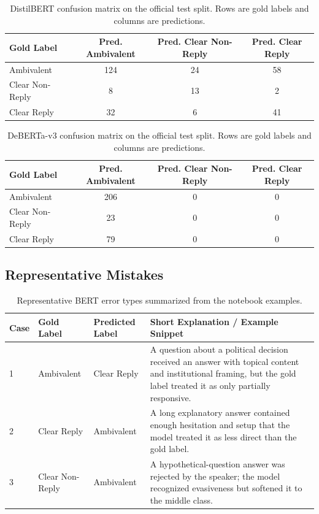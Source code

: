 \begin{table}[h]
\centering
\small
\begin{tabular}{lccc}
\toprule
Gold Label & Pred. Ambivalent & Pred. Clear Non-Reply & Pred. Clear Reply \\
\midrule
Ambivalent & 124 & 24 & 58 \\
Clear Non-Reply & 8 & 13 & 2 \\
Clear Reply & 32 & 6 & 41 \\
\bottomrule
\end{tabular}
\caption{DistilBERT confusion matrix on the official test split. Rows are gold labels and columns are predictions.}
\label{tab:distilbert-confusion}
\end{table}

\begin{table}[h]
\centering
\small
\begin{tabular}{lccc}
\toprule
Gold Label & Pred. Ambivalent & Pred. Clear Non-Reply & Pred. Clear Reply \\
\midrule
Ambivalent & 206 & 0 & 0 \\
Clear Non-Reply & 23 & 0 & 0 \\
Clear Reply & 79 & 0 & 0 \\
\bottomrule
\end{tabular}
\caption{DeBERTa-v3 confusion matrix on the official test split. Rows are gold labels and columns are predictions.}
\label{tab:deberta-confusion}
\end{table}

\subsection{Representative Mistakes}

\begin{table}[h]
\centering
\small
\begin{tabularx}{\textwidth}{l l l X}
\toprule
Case & Gold Label & Predicted Label & Short Explanation / Example Snippet \\
\midrule
1 & Ambivalent & Clear Reply & A question about a political decision received an answer with topical content and institutional framing, but the gold label treated it as only partially responsive. \\
2 & Clear Reply & Ambivalent & A long explanatory answer contained enough hesitation and setup that the model treated it as less direct than the gold label. \\
3 & Clear Non-Reply & Ambivalent & A hypothetical-question answer was rejected by the speaker; the model recognized evasiveness but softened it to the middle class. \\
\bottomrule
\end{tabularx}
\caption{Representative BERT error types summarized from the notebook examples.}
\label{tab:error-examples}
\end{table}

